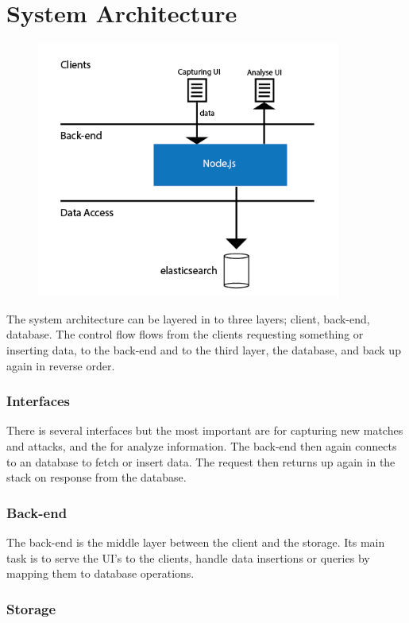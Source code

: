 

\section{System Architecture}

\begin{figure}[ht!]
\centering
\includegraphics[width=100mm]{images/general/arhitecture.png}
\caption{}
\label{overflow}
\end{figure}

The system architecture can be layered in to three layers; client, back-end, database. The control flow flows from the clients requesting something or inserting data, to the back-end and to the third layer, the database, and back up again in reverse order. 

\subsubsection{Interfaces}
There is several interfaces but the most important are for capturing new matches and attacks, and the for analyze information. The back-end then again connects to an database to fetch or insert data.  The request then returns up again in the stack on response from the database.

\subsubsection{Back-end}

The back-end is the middle layer between the client and the storage. Its main task is to serve the UI's to the clients, handle data insertions or queries by mapping them to database operations. 

\subsubsection{Storage}

